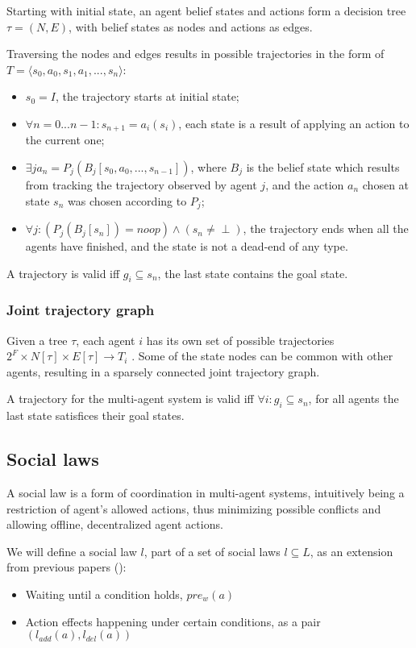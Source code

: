 \documentclass[fleqn,10pt]{olplainarticle}
\begin{document}
Starting with initial state, an agent belief states and actions form a decision tree $\tau = (N,E)$, with belief states as nodes and actions as edges. \label{trajectory}

Traversing the nodes and edges results in possible trajectories in the form of $T = \langle s_0, a_0, s_1, a_1, ..., s_n \rangle$:
\begin{itemize}
    \item $s_0 = I$, the trajectory starts at initial state;
    \item $\forall n=0...n-1: s_{n+1}=a_i(s_i)$, each state is a result of applying an action to the current one;
    \item $\exists ja_n = P_j(B_j[s_0,a_0,...,s_{n-1}])$, where $B_j$ is the belief state which results from tracking the trajectory observed by agent $j$, and the action $a_n$ chosen at state $s_n$ was chosen according to $P_j$;
    \item $\forall j: (P_j(B_j[s_n]) = noop) \land (s_n \neq \perp)$, the trajectory ends when all the agents have finished, and the state is not a dead-end of any type. \label{finish}
\end{itemize}

A trajectory is valid iff $g_i \subseteq s_n$, the last state contains the goal state.

\subsubsection{Joint trajectory graph}

Given a tree $\tau$, each agent $i$ has its own set of possible trajectories $2^F \times N[\tau] \times E[\tau] \rightarrow T_i$ . Some of the state nodes can be common with other agents, resulting in a sparsely connected joint trajectory graph.

A trajectory for the multi-agent system is valid iff $\forall i: g_i \subseteq s_n$, for all agents the last state satisfices their goal states. 

\subsection{Social laws} \label{soc-laws}
A social law is a form of coordination in multi-agent systems, intuitively being a restriction of agent's allowed actions, thus minimizing possible conflicts and allowing offline, decentralized agent actions.

We will define a social law $l$, part of a set of social laws $l \subseteq L$, as an extension from previous papers (\cite{karpas_automated_2017}): 
\begin{itemize}
    \item Waiting until a condition holds, $pre_w(a)$
    \item Action effects happening under certain conditions, as a pair $(l_{add}(a), l_{del}(a))$
\end{itemize}
\end{document}
